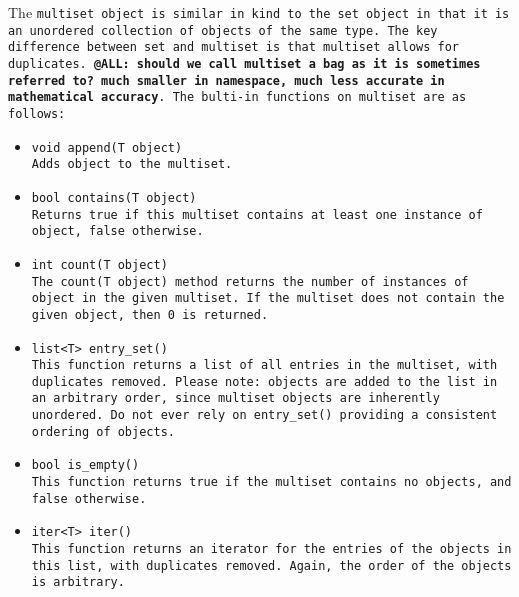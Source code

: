 \documentclass{book}
\begin{document}
The \tt multiset \rm object is similar in kind to the \tt set \rm object in that
it is an unordered collection of objects of the same type. The key difference
between \tt set \rm and \tt multiset \rm is that \tt multiset \rm allows for
duplicates. \textbf{@ALL: should we call multiset a \tt bag \rm as it is sometimes
referred to? much smaller in namespace, much less accurate in mathematical accuracy}.
The bulti-in functions on \tt multiset \rm are as follows:

\begin{itemize}

\item[] \tt void append(T object) \rm \\

Adds \tt object \rm to the \tt multiset\rm.

\item[] \tt bool contains(T object) \rm \\

Returns \tt true \rm if this \tt multiset \rm contains at least one instance of
\tt object\rm, \tt false \rm otherwise.

\item[] \tt int count(T object) \rm \\

The \tt count(T object) \rm method returns the number of instances of \tt object \rm
in the given \tt multiset\rm. If the \tt multiset \rm does not contain the given
object, then \tt 0 \rm is returned. 

\item[] \tt list<T> entry\_set() \rm \\

This function returns a list of all entries in the multiset, with duplicates removed.
Please note: objects are added to the list in an arbitrary order, since \tt multiset
\rm objects are inherently unordered. Do not ever rely on \tt entry\_set() \rm 
providing a consistent ordering of objects.

\item[] \tt bool is\_empty() \rm \\

This function returns \tt true \rm if the \tt multiset \rm contains no objects, and
\tt false \rm otherwise.

\item[] \tt iter<T> iter() \rm \\

This function returns an iterator for the entries of the objects in this list,
with duplicates removed. Again, the order of the objects is arbitrary. 


\end{itemize}
\end{document}
